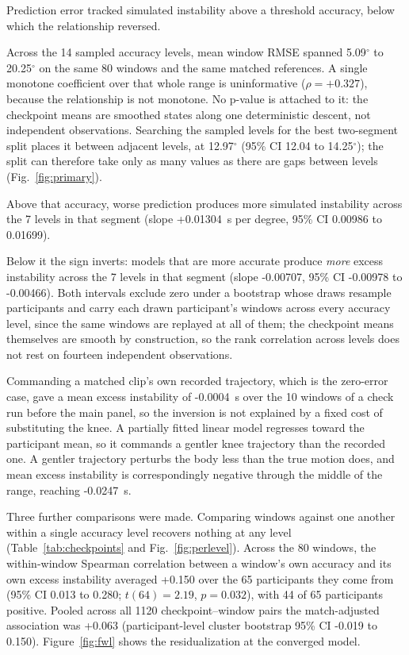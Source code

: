 \documentclass[referee,lineno,pdflatex,sn-vancouver-num]{sn-jnl}
\begin{document}
Prediction error tracked simulated instability above a threshold accuracy,
below which the relationship reversed.

Across the 14 sampled accuracy levels, mean window
RMSE spanned 5.09$^{\circ}$ to
20.25$^{\circ}$ on the same
80 windows and the same matched references. A single monotone
coefficient over that whole range is uninformative
($\rho=+0.327$), because the
relationship is not monotone. No p-value is attached to it: the checkpoint
means are smoothed states along one deterministic descent, not independent
observations. Searching the sampled levels for the best two-segment split places
it between adjacent levels, at
12.97$^{\circ}$ (95\% CI
12.04 to 14.25$^{\circ}$); the split can therefore
take only as many values as there are gaps between levels
(Fig.~\ref{fig:primary}).

Above that accuracy, worse prediction produces more simulated instability across
the 7 levels in that segment (slope
+0.01304~s per
degree, 95\% CI 0.00986 to 0.01699).

Below it the sign inverts: models that are more accurate produce \emph{more} excess
instability across the 7 levels in that
segment (slope -0.00707,
95\% CI -0.00978 to -0.00466). Both intervals exclude
zero under a bootstrap whose draws resample participants and carry each drawn
participant's windows across every accuracy level, since the same windows are
replayed at all of them; the checkpoint means themselves are smooth by
construction, so the rank correlation across levels does not rest on fourteen
independent observations.

Commanding a matched clip's own recorded trajectory, which is the zero-error
case, gave a mean excess instability of -0.0004~s over the
10 windows of a check run before the main panel, so the
inversion is not explained by a
fixed cost of substituting the knee. A partially
fitted linear model regresses toward the participant mean, so it commands a
gentler knee trajectory than the recorded one. A gentler trajectory perturbs the
body less than the true motion does, and mean excess instability is
correspondingly negative through the middle of the range, reaching
-0.0247~s.

Three further comparisons were made. Comparing windows against one another within a
single accuracy level recovers nothing at any level
(Table~\ref{tab:checkpoints} and Fig.~\ref{fig:perlevel}).
Across the 80 windows, the within-window Spearman correlation between a window's own accuracy and its own excess instability averaged +0.150 over the 65 participants they come from (95\% CI 0.013 to 0.280; $t(64)=2.19$, $p=0.032$), with 44 of 65 participants positive. Pooled across all 1120 checkpoint--window pairs
the match-adjusted association was
+0.063 (participant-level cluster bootstrap 95\% CI
-0.019 to 0.150). Figure~\ref{fig:fwl} shows the
residualization at the converged model.
\end{document}

